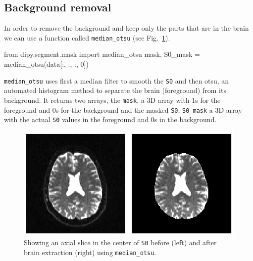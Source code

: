 \documentclass{bioinfo}
\begin{document}
\subsection{Background removal}
In order to remove the background and keep only the parts that are in the brain
we can use a function called \texttt{median\_otsu} (see Fig.~\ref{Fig:brain_segmentation}).
\begin{python}
from dipy.segment.mask import median_otsu
mask, S0_mask = median_otsu(data[:, :, :, 0])
\end{python}
\texttt{median\_otsu} uses first a median filter to smooth the \texttt{S0} and
then otsu, an automated histogram method \citep{Otsu1979} to separate the brain
(foreground) from its background. It returns two arrays, the \texttt{mask}, a
3D array with 1s for the foreground and 0s for the background and the masked
\texttt{S0}, \texttt{S0\_mask} a 3D array with the actual \texttt{S0} values in
the foreground and 0s in the background.

\begin{figure}
\includegraphics[scale=0.65]{Figures/median_otsu.eps}
\centering{}
\caption{Showing an axial slice in the center of \texttt{S0} before (left) and after brain extraction (right) using \texttt{median\_otsu}. \label{Fig:brain_segmentation}}
\end{figure}
\end{document}

